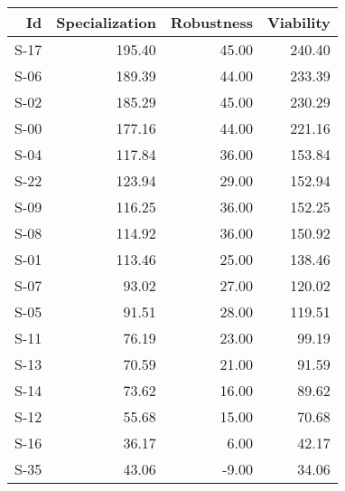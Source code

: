 

\begin{tabular}{ | r | r | r | r | }
    \hline
                    Id  &  Specialization  &      Robustness  &       Viability  \\
    \hline
    \hline
                  S-17  &          195.40  &           45.00  &          240.40  \\
    \hline
                  S-06  &          189.39  &           44.00  &          233.39  \\
    \hline
                  S-02  &          185.29  &           45.00  &          230.29  \\
    \hline
                  S-00  &          177.16  &           44.00  &          221.16  \\
    \hline
                  S-04  &          117.84  &           36.00  &          153.84  \\
    \hline
                  S-22  &          123.94  &           29.00  &          152.94  \\
    \hline
                  S-09  &          116.25  &           36.00  &          152.25  \\
    \hline
                  S-08  &          114.92  &           36.00  &          150.92  \\
    \hline
                  S-01  &          113.46  &           25.00  &          138.46  \\
    \hline
                  S-07  &           93.02  &           27.00  &          120.02  \\
    \hline
                  S-05  &           91.51  &           28.00  &          119.51  \\
    \hline
                  S-11  &           76.19  &           23.00  &           99.19  \\
    \hline
                  S-13  &           70.59  &           21.00  &           91.59  \\
    \hline
                  S-14  &           73.62  &           16.00  &           89.62  \\
    \hline
                  S-12  &           55.68  &           15.00  &           70.68  \\
    \hline
                  S-16  &           36.17  &            6.00  &           42.17  \\
    \hline
                  S-35  &           43.06  &           -9.00  &           34.06  \\

\end{tabular}
